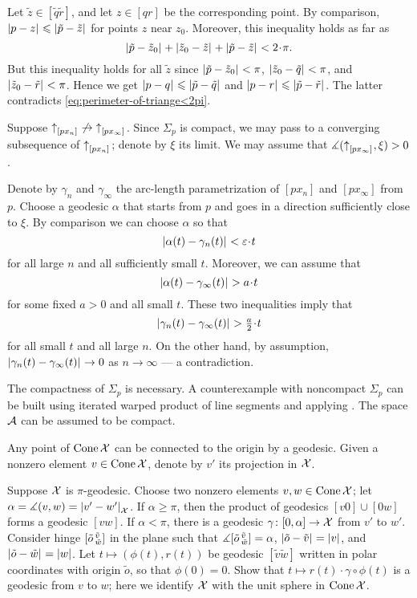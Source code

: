 Let $\tilde z\in [\tilde q\tilde r]$,
and let $z\in [q r]$ be the corresponding point.
By comparison, $|{p}-{z}|_{}^{{}}\leqslant|{\tilde p}-{\tilde z}|_{}^{{}}$ for points $z$ near $z_0$.
Moreover, this inequality holds as far as 
\[\dist{\tilde p}{\tilde z_0}{}+\dist{\tilde z_0}{\tilde z}{}+\dist{\tilde p}{\tilde z}{}<2\cdot\pi.\]
But this inequality holds for all $\tilde z$ since  $|{\tilde p}-{\tilde z_0}|_{}^{{}}<\pi$, $|{\tilde z_0}-{\tilde q}|_{}^{{}}<\pi$, and $|{\tilde z_0}-{\tilde r}|_{}^{{}}<\pi$.
Hence we get $|{p}-{q}|_{}^{{}}\leqslant|{\tilde p}-{\tilde q}|_{}^{{}}$ and $|{p}-{r}|_{}^{{}}\leqslant|{\tilde p}-{\tilde r}|_{}^{{}}$.
The latter contradicts \ref{eq:perimeter-of-triange<2pi}.

Suppose ${\uparrow}_{[{p}{x_n}]_{{}}}\not\to{\uparrow}_{[{p}{x_\infty}]_{{}}}$.
Since $\Sigma_p$ is compact, we may pass to a converging subsequence of ${\uparrow}_{[{p}{x_n}]_{{}}}$;
denote by $\xi$ its limit.
We may assume that $\measuredangle ({\uparrow}_{[{p}{x_\infty}]_{{}}},\xi)>0$.

Denote by $\gamma_n$ and $\gamma_\infty$ the arc-length parametrization of $[px_n]$ and $[px_\infty]$ from $p$.
Choose a geodesic $\alpha$ that starts from $p$ and goes in a direction sufficiently close to $\xi$.
By comparison we can choose $\alpha$ so that
\[\dist{\alpha(t)}{\gamma_n(t)}{}<\eps\cdot t\]
for all large $n$ and all sufficiently small $t$.
Moreover, we can assume that
\[\dist{\alpha(t)}{\gamma_\infty(t)}{}>a\cdot t\]
for some fixed $a>0$ and all small $t$.
These two inequalities imply 
that 
\[\dist{\gamma_n(t)}{\gamma_\infty(t)}{}>\tfrac a2\cdot t\]
for all small $t$ and all large $n$.
On the other hand, by assumption, $|{\gamma_n(t)}-{\gamma_\infty(t)}|_{}^{{}}\to0$ as $n\to\infty$ --- a contradiction.

The compactness of $\Sigma_p$ is necessary.
A counterexample with noncompact  $\Sigma_p$ can be built using iterated warped product of line segments and applying \cite[Theorem 1.2]{alexander-bishop2004}.
The space $\mathcal{A}$ can be assumed to be compact.


Any point of $\mathop{\rm Cone}\nolimits \mathcal{X}$ can be connected to the origin by a geodesic.
Given a nonzero element $v\in\mathop{\rm Cone}\nolimits \mathcal{X}$, denote by $v'$ its projection in $\mathcal{X}$.

Suppose $\mathcal{X}$ is $\pi$-geodesic.
Choose two nonzero elements $v,w\in\mathop{\rm Cone}\nolimits \mathcal{X}$; let $\alpha=\measuredangle(v,w)=|{v'}-{w'}|_{\mathcal{X}}^{{}}$.
If $\alpha\ge \pi$, then the product of geodesics $[v0]\cup [0w]$ forms a geodesic $[vw]$.
If $\alpha<\pi$, there is a geodesic $\gamma\colon[0,\alpha]\to \mathcal{X}$ from $v'$ to $w'$.
Consider hinge $[\tilde o\,{}^{\tilde v}_{\tilde w}]$ in the plane 
such that $\measuredangle[\tilde o\,{}^{\tilde v}_{\tilde w}]=\alpha$, $|{\tilde o}-{\tilde v}|_{}^{{}}=|v|$, and $|{\tilde o}-{\tilde w}|_{}^{{}}=|w|$.
Let $t\mapsto (\phi(t),r(t))$ be geodesic $[\tilde v\tilde w]$ written in polar coordinates with origin $\tilde o$, so that $\phi(0)=0$.
Show that $t\mapsto r(t)\cdot\gamma\circ\phi(t)$ is a geodesic from $v$ to $w$;
here we identify $\mathcal{X}$ with the unit sphere in $\mathop{\rm Cone}\nolimits \mathcal{X}$.

